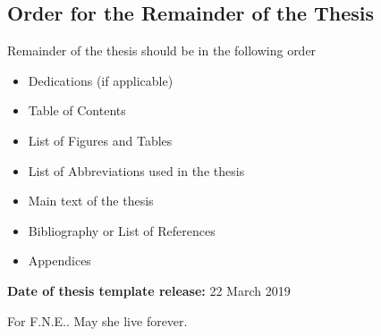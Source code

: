 



\begin{instructional}
\section*{Order for the Remainder of the Thesis}
\noindent
    Remainder of the thesis should be in the following order

    \begin{itemize}
        \item Dedications (if applicable)
        \item Table of Contents
        \item List of Figures and Tables
        \item List of Abbreviations used in the thesis
        \item Main text of the thesis
        \item Bibliography or List of References
        \item Appendices
    \end{itemize}

\noindent
\textbf{Date of thesis template release:} 22 March 2019
\end{instructional}
\clearpage


	\rmfamily
	\normalfont
    
    	\begin{vplace}[1]
		\begin{center}
        For F.N.E.. May she live forever.
		\end{center}
	\end{vplace}


\clearpage
\pagestyle{headings}


\tableofcontents
	\clearpage
\listoffigures
	\clearpage
\listoftables
\newpage

